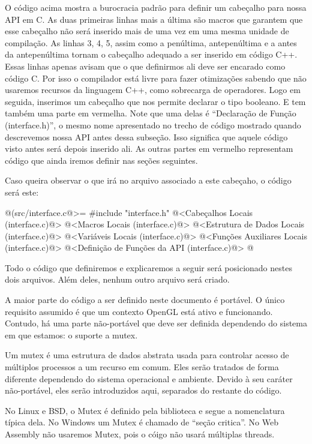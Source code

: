 O código acima mostra a burocracia padrão para definir um cabeçalho
para nossa API em C. As duas primeiras linhas mais a última são macros
que garantem que esse cabeçalho não será inserido mais de uma vez em
uma mesma unidade de compilação. As linhas 3, 4, 5, assim como a
penúltima, antepenúltima e a antes da antepenúltima tornam o cabeçalho
adequado a ser inserido em código C++. Essas linhas apenas avisam que
o que definirmos ali deve ser encarado como código C. Por isso o
compilador está livre para fazer otimizações sabendo que não usaremos
recursos da linguagem C++, como sobrecarga de operadores. Logo em
seguida, inserimos um cabeçalho que nos permite declarar o tipo
booleano. E tem também uma parte em vermelha. Note que uma delas é
``Declaração de Função (interface.h)'', o mesmo nome apresentado no trecho de
código mostrado quando descrevemos nossa API antes dessa
subseção. Isso significa que aquele código visto antes será depois
inserido ali. As outras partes em vermelho representam código que
ainda iremos definir nas seções seguintes.

Caso queira observar o que irá no arquivo 
associado a este cabeçaho, o código será este:

\iniciocodigo
@(src/interface.c@>=
#include "interface.h"
@<Cabeçalhos Locais (interface.c)@>
@<Macros Locais (interface.c)@>
@<Estrutura de Dados Locais (interface.c)@>
@<Variáveis Locais (interface.c)@>
@<Funções Auxiliares Locais (interface.c)@>
@<Definição de Funções da API (interface.c)@>
@
\fimcodigo

Todo o código que definiremos e explicaremos a seguir será posicionado
nestes dois arquivos. Além deles, nenhum outro arquivo será criado.


A maior parte do código a ser definido neste documento é portável. O
único requisito assumido é que um contexto OpenGL está ativo e
funcionando. Contudo, há uma parte não-portável que deve ser definida
dependendo do sistema em que estamos: o suporte a mutex.

Um mutex é uma estrutura de dados abstrata usada para controlar acesso
de múltiplos processos a um recurso em comum. Eles serão tratados de
forma diferente dependendo do sistema operacional e ambiente. Devido à
seu caráter não-portável, eles serão introduzidos aqui, separados do
restante do código.

No Linux e BSD, o Mutex é definido pela biblioteca
 e segue a nomenclatura típica dela. No Windows um
Mutex é chamado de ``seção critica''. No Web Assembly não usaremos
Mutex, pois o cóigo não usará múltiplas threads.

